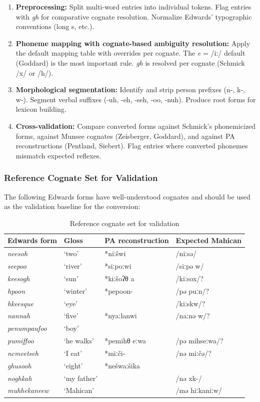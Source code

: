 \begin{enumerate}
  \item \textbf{Preprocessing:} Split multi-word entries into individual
    tokens. Flag entries with \textit{gh} for comparative cognate resolution.
    Normalize Edwards' typographic conventions (long s, etc.).
  \item \textbf{Phoneme mapping with cognate-based ambiguity resolution:}
    Apply the default mapping table with overrides per cognate. The
    \textit{e} = /iː/ default (Goddard) is the most important rule.
    \textit{gh} is resolved per cognate (Schmick /x/ or /h/).
  \item \textbf{Morphological segmentation:} Identify and strip person
    prefixes (n-, k-, w-). Segment verbal suffixes (-uh, -eh, -seh, -oo,
    -nuh). Produce root forms for lexicon building.
  \item \textbf{Cross-validation:} Compare converted forms against Schmick's
    phonemicized forms, against Munsee cognates (Zeisberger, Goddard), and
    against PA reconstructions (Pentland, Siebert). Flag entries where
    converted phonemes mismatch expected reflexes.
\end{enumerate}

\subsubsection{Reference Cognate Set for Validation}

The following Edwards forms have well-understood cognates and should be used
as the validation baseline for the conversion:

\begin{table}[h]
\centering
\begin{tabular}{llll}
\toprule
\textbf{Edwards form} & \textbf{Gloss} & \textbf{PA reconstruction} & \textbf{Expected Mahican} \\
\midrule
\textit{neesoh} & `two' & *niːšwi & /niːsə/ \\
\textit{seepoo} & `river' & *siːpoːwi & /siːpə w/ \\
\textit{keesogh} & `sun' & *kiːšoʔθ a & /kiːsox/? \\
\textit{hpoon} & `winter' & *pepoon- & /pə puːn/? \\
\textit{hkeesque} & `eye' & & /kiːskw/? \\
\textit{nannah} & `five' & *nyaːlanwi & /naːnə w/? \\
\textit{penumpaufoo} & `boy' & & \\
\textit{pumiffoo} & `he walks' & *pemihθ eːwa & /pə mihseːwa/? \\
\textit{ncmeetseh} & `I eat' & *miːči- & /nə miːčə/? \\
\textit{ghusooh} & `eight' & *nešwaːšika & \\
\textit{noghkah} & `my father' & & /nə xk-/ \\
\textit{muhhekaneew} & `Mahican' & & /mə hiːkaniːw/ \\
\bottomrule
\end{tabular}
\caption{Reference cognate set for validation}
\label{tab:1369-cognates}
\end{table}

